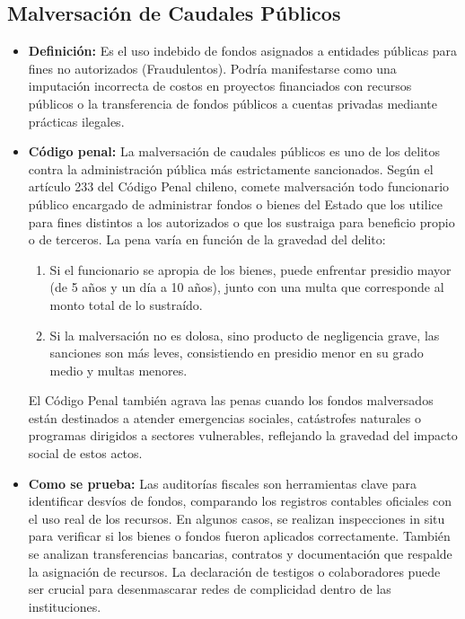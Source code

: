\documentclass[letter,12pt]{article}
\begin{document}
	\subsection{Malversación de Caudales Públicos}
	\begin{itemize}
		\item \textbf{Definición: }Es el uso indebido de fondos asignados a entidades públicas para fines no autorizados (Fraudulentos). Podría manifestarse como una imputación incorrecta de costos en proyectos financiados con recursos públicos o la transferencia de fondos públicos a cuentas privadas mediante prácticas ilegales.\\
		
		\item \textbf{Código penal: }La malversación de caudales públicos es uno de los delitos contra la administración pública más estrictamente sancionados. Según el artículo 233 del Código Penal chileno, comete malversación todo funcionario público encargado de administrar fondos o bienes del Estado que los utilice para fines distintos a los autorizados o que los sustraiga para beneficio propio o de terceros. La pena varía en función de la gravedad del delito:
		\begin{enumerate}
			\item Si el funcionario se apropia de los bienes, puede enfrentar presidio mayor (de 5 años y un día a 10 años), junto con una multa que corresponde al monto total de lo sustraído.\\
			\item Si la malversación no es dolosa, sino producto de negligencia grave, las sanciones son más leves, consistiendo en presidio menor en su grado medio y multas menores.
		\end{enumerate}
		El Código Penal también agrava las penas cuando los fondos malversados están destinados a atender emergencias sociales, catástrofes naturales o programas dirigidos a sectores vulnerables, reflejando la gravedad del impacto social de estos actos.\\
		\newpage
		
		\item \textbf{Como se prueba: }Las auditorías fiscales son herramientas clave para identificar desvíos de fondos, comparando los registros contables oficiales con el uso real  de los recursos. En algunos casos, se realizan inspecciones in situ para verificar si los bienes o fondos fueron aplicados correctamente. También se analizan transferencias bancarias, contratos y documentación que respalde la asignación de recursos. La declaración de testigos o colaboradores puede ser crucial para desenmascarar redes de complicidad dentro de las instituciones.\\
		

\end{itemize}
\end{document}
